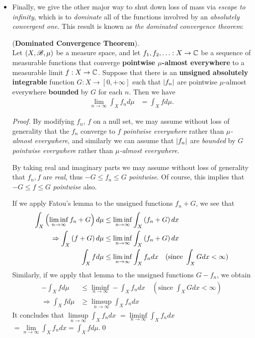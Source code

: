 \documentclass[11pt]{article}
\begin{document}
\begin{itemize}
\item Finally, we give the other major way to shut down loss of mass via \emph{escape to infinity}, which is to \emph{dominate} all of the functions involved by
an \emph{absolutely convergent one}. This result is known as \emph{the dominated convergence theorem}:

\begin{theorem} (\textbf{Dominated Convergence Theorem}). \\
Let $(X, {\mathscr B}, \mu)$ be a measure space, and let $f_1, f_2, \ldots : X\rightarrow {\mathbb C}$ be a sequence of measurable functions that converge \textbf{pointwise $\mu$-almost everywhere} to a measurable limit $f : X\rightarrow {\mathbb C}$. Suppose that there is an \textbf{unsigned absolutely integrable} function $G : X\rightarrow [0, +\infty]$ such that $\left\lvert f_n \right\rvert$ are pointwise $\mu$-almost everywhere \textbf{bounded} by $G$ for each $n$. Then we have
\begin{align*}
\lim\limits_{n\rightarrow \infty}\int_{X}f_{n}d\mu  &= \int_{X}f d\mu.
\end{align*}
\end{theorem}
\begin{proof}
By modifying $f_n$, $f$ on a null set, we may assume without loss of generality that the $f_n$ converge to $f$ \emph{pointwise everywhere} rather than \emph{$\mu$-almost everywhere}, and similarly we can assume that $\left\lvert f_n \right\rvert$ are \emph{bounded} by $G$ \emph{pointwise everywhere} rather than \emph{$\mu$-almost everywhere}.

By taking real and imaginary parts we may assume without loss of generality that $f_n,  f$ are \emph{real}, thus $-G \le  f_n \le G$ \emph{pointwise}. Of course, this implies that $-G \le  f \le G$ \emph{pointwise} also. 

If we apply Fatou's lemma  to the unsigned functions $f_n + G$, we see that
\begin{align*}
\int_{X}\left(\liminf\limits_{n\rightarrow \infty}f_n + G\right)d\mu &\le \liminf\limits_{n\rightarrow \infty}\int_{X}\left(f_{n}+ G\right)dx\\
\Rightarrow \int_{X}\left(f + G\right)d\mu &\le \liminf\limits_{n\rightarrow \infty}\int_{X}\left(f_{n}+ G\right)dx\\
\int_{X}fd\mu &\le \liminf\limits_{n\rightarrow \infty }\int_{X}f_{n}dx \quad (\text{since } \int_{X}G dx < \infty )
\end{align*}
Similarly, if we apply that lemma to the unsigned functions $G - f_n$, we obtain
\begin{align*}
-\int_{X}fd\mu &\le \liminf\limits_{n\rightarrow \infty }-\int_{X}f_{n}dx \quad (\text{since } \int_{X}G dx < \infty )\\
\Rightarrow \int_{X}fd\mu &\ge \limsup\limits_{n\rightarrow \infty }\int_{X}f_{n}dx 
\end{align*}
It concludes that $ \limsup\limits_{n\rightarrow \infty }\int_{X}f_{n}dx$ $=\liminf\limits_{n\rightarrow \infty }\int_{X}f_{n}dx$ $=\lim\limits_{n\rightarrow \infty }\int_{X}f_{n}dx=\int_{X}fd\mu$.\qed
\end{proof}


\end{itemize}
\end{document}
